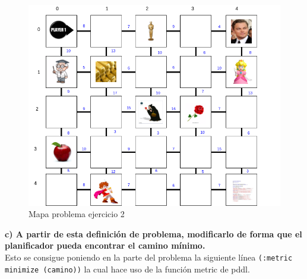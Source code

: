 \documentclass[12pt]{article}
\begin{document}
\begin{figure}[H] 
	\centering
	\includegraphics[width=12cm]{Ej2_1.png}
	\caption{Mapa problema ejercicio 2}
\end{figure}

\textbf{c) A partir de esta definición de problema, modificarlo de forma que el
planificador pueda encontrar el camino mínimo.}\\

Esto se consigue poniendo en la parte del problema la siguiente línea \texttt{(:metric minimize (camino))} la cual hace uso de la función metric de pddl.\\
\end{document}
